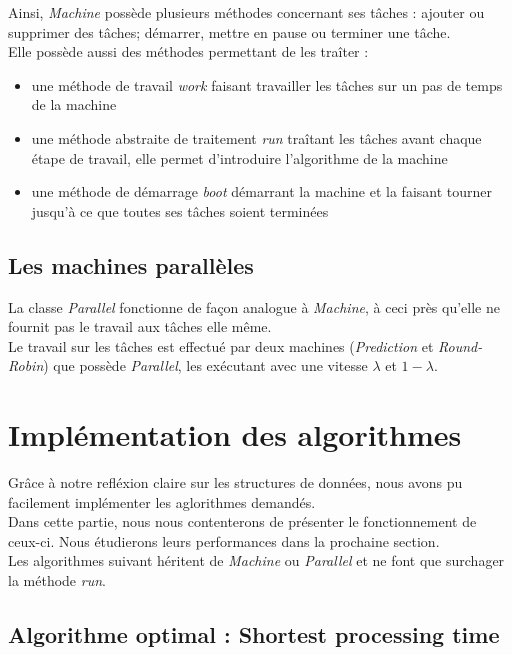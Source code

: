 \documentclass[12pt]{article}
\begin{document}
Ainsi, \emph{Machine} possède plusieurs méthodes concernant ses tâches : ajouter ou supprimer des tâches; démarrer, mettre en pause ou terminer une tâche. \\

Elle possède aussi des méthodes permettant de les traîter :
\begin{itemize}
	\item une méthode de travail \emph{work} faisant travailler les tâches sur un pas de temps de la machine
	\item une méthode abstraite de traitement \emph{run} traîtant les tâches avant chaque étape de travail, elle permet d'introduire l'algorithme de la machine
	\item une méthode de démarrage \emph{boot} démarrant la machine et la faisant tourner jusqu'à ce que toutes ses tâches soient terminées
\end{itemize}

\subsection{Les machines parallèles}
La classe \emph{Parallel} fonctionne de façon analogue à \emph{Machine}, à ceci près qu'elle ne fournit pas le travail aux tâches elle même. \\

Le travail sur les tâches est effectué par deux machines (\emph{Prediction} et \emph{Round-Robin}) que possède \emph{Parallel}, les exécutant avec une vitesse $\lambda$ et $1 - \lambda$.

\newpage
\section{Implémentation des algorithmes}

Grâce à notre refléxion claire sur les structures de données, nous avons pu facilement implémenter les aglorithmes demandés. \\

Dans cette partie, nous nous contenterons de présenter le fonctionnement de ceux-ci. Nous étudierons leurs performances dans la prochaine section. \\

Les algorithmes suivant héritent de \emph{Machine} ou \emph{Parallel} et ne font que surchager la méthode \emph{run}. \\

\subsection{Algorithme optimal : Shortest processing time}
\end{document}
